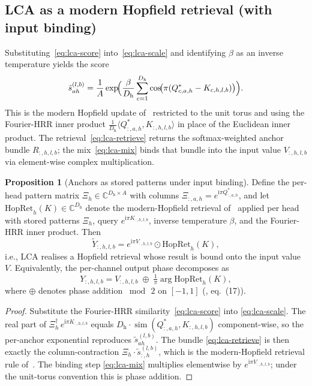 \documentclass[11pt]{article}
\newcommand{\C}{\mathbb{C}}
\newcommand{\im}{\mathrm{i}}
\newcommand{\Dh}{D_{\mathrm{h}}} %
\newcommand{\sm}{\operatorname{sim}}
\newcommand{\ie}{i.e.}
\theoremstyle{definition}
\newtheorem{proposition}{Proposition}
\begin{document}
\subsection{LCA as a modern Hopfield retrieval (with input binding)}

Substituting~\eqref{eq:lca-score} into~\eqref{eq:lca-scale} and
identifying $\beta$ as an inverse temperature yields the score
\[
  \tilde s_{a h}^{(l,b)}
    = \frac{1}{A}\exp\!\Bigl(
        \frac{\beta}{\Dh}\sum_{c=1}^{\Dh}
          \cos\!\bigl(\pi(Q^{*}_{c,a,h} - K_{c,h,l,b})\bigr)\Bigr).
\]
This is the modern Hopfield update of~\cite{hopfield-is-all-you-need}
restricted to the unit torus and using the Fourier-HRR inner product
$\tfrac{1}{\Dh}\langle Q^{*}_{:,a,h}, K_{:,h,l,b}\rangle$ in place of
the Euclidean inner product. The retrieval~\eqref{eq:lca-retrieve}
returns the softmax-weighted anchor bundle $R_{:,h,l,b}$; the
mix~\eqref{eq:lca-mix} binds that bundle into the input value
$V_{:,h,l,b}$ via element-wise complex multiplication.

\begin{proposition}[Anchors as stored patterns under input binding]\label{prop:lca-hopfield}
Define the per-head pattern matrix $\Xi_h \in \C^{\Dh \times A}$ with
columns $\Xi_{:,a,h} = e^{\im\pi Q^{*}_{:,a,h}}$, and let
$\mathrm{HopRet}_h(K) \in \C^{\Dh}$ denote the modern-Hopfield retrieval
of~\cite{hopfield-is-all-you-need} applied per head with stored patterns
$\Xi_h$, query $e^{\im\pi K_{:,h,l,b}}$, inverse temperature $\beta$,
and the Fourier-HRR inner product. Then
\[
  \tilde Y_{:,h,l,b}
  = e^{\im\pi V_{:,h,l,b}} \odot \mathrm{HopRet}_h(K),
\]
\ie, LCA realises a Hopfield retrieval whose result is bound onto the
input value $V$. Equivalently, the per-channel output phase decomposes
as
\[
  Y_{:,h,l,b}
  = V_{:,h,l,b}
  \;\oplus\; \tfrac{1}{\pi}\arg \mathrm{HopRet}_h(K),
\]
where $\oplus$ denotes phase addition $\bmod\,2$ on $[-1,1]$
(\cite{phasor-ssm-derivation}, eq.~(17)).
\end{proposition}

\begin{proof}
Substitute the Fourier-HRR similarity~\eqref{eq:lca-score} into
\eqref{eq:lca-scale}. The real part of $\Xi_h^{\dagger}\,
e^{\im\pi K_{:,h,l,b}}$ equals $\Dh \cdot
\sm(Q^{*}_{:,a,h}, K_{:,h,l,b})$ component-wise, so the per-anchor
exponential reproduces $\tilde s_{a h}^{(l,b)}$. The bundle
\eqref{eq:lca-retrieve} is then exactly the column-contraction
$\Xi_h \cdot \tilde s_{:,h}^{(l,b)}$, which is the modern-Hopfield
retrieval rule of~\cite{hopfield-is-all-you-need}. The binding step
\eqref{eq:lca-mix} multiplies elementwise by $e^{\im\pi V_{:,h,l,b}}$;
under the unit-torus convention this is phase addition.
\end{proof}
\end{document}
